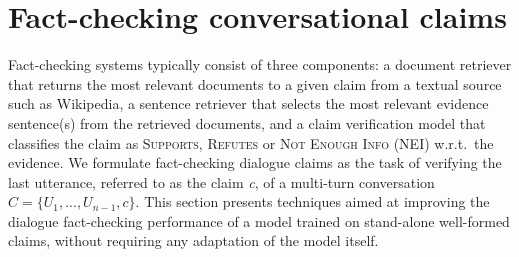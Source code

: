 \section{Fact-checking conversational claims}
Fact-checking systems typically consist of three components: a document retriever that returns the most relevant documents to a given claim from a textual source such as Wikipedia, a sentence retriever that selects the most relevant evidence sentence(s) from the retrieved documents, and a claim verification model that classifies the claim as \textsc{Supports}, \textsc{Refutes} or \textsc{Not Enough Info} (NEI) 
w.r.t.\ the evidence. We formulate fact-checking dialogue claims as the task of verifying the last utterance, referred to as the claim \textit{c}, of a multi-turn conversation $C = \{ U_1, ..., U_{n-1}, c\}$. %
%
This section presents techniques aimed at improving the dialogue fact-checking performance of a model trained on stand-alone well-formed claims, without requiring any adaptation of the model itself. 

